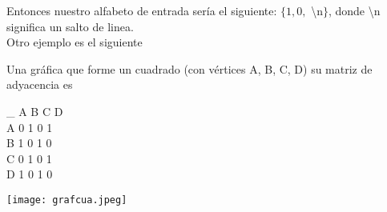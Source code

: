 \documentclass[12pt,letterpaper]{article}
\begin{document}

Entonces nuestro alfabeto de entrada sería el siguiente: $\{1,0,$ \textbackslash n$\}$, donde \textbackslash n significa un salto de linea.\\
Otro ejemplo es el siguiente

Una gráfica que forme un cuadrado (con vértices A, B, C, D) su matriz de adyacencia es


\begin{center}
\_ A B C D\\
A  0 1 0 1 \\
B  1 0 1 0\\
C  0 1 0 1\\
D  1 0 1 0 \\
\end{center}

\begin{center}
    \texttt{[image: grafcua.jpeg]}
\end{center}




\end{document}
